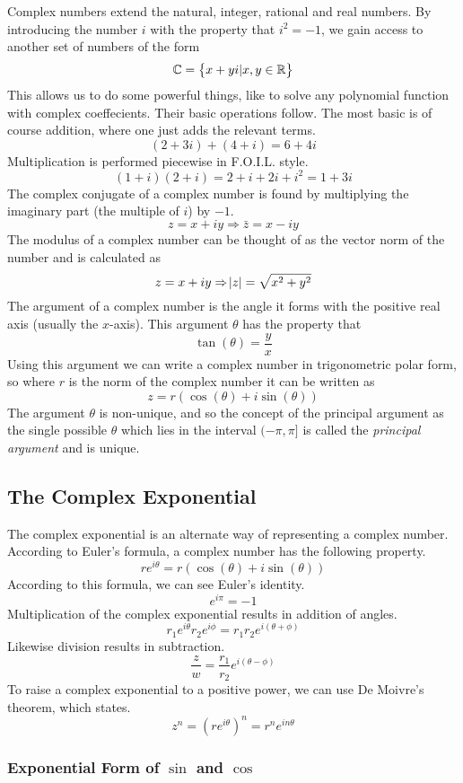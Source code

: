 \documentclass[12pt]{report}
\newcommand{\R}{\mathbb{R}}
\newcommand{\C}{\mathbb{C}}
\begin{document}
\begin{flushleft}
Complex numbers extend the natural, integer, rational and real numbers. By 
introducing the number \(i\) with the property that \(i^2 = -1\), we gain
access to another set of numbers of the form
\[\C = \set{x + yi | x, y \in \R}\]
This allows us to do some powerful things, like to solve any polynomial
function with complex coeffecients. Their basic operations follow. The most
basic is of course addition, where one just adds the relevant terms.
\[(2 + 3i) + (4 + i) = 6 + 4i\]
Multiplication is performed piecewise in F.O.I.L. style.
\[(1 + i)(2 + i) = 2 + i + 2i + i^2 = 1 + 3i\]
The complex conjugate of a complex number is found by multiplying the imaginary
part (the multiple of \(i\)) by \(-1\).
\[z = x + iy \Rightarrow \bar{z} = x - iy\]
The modulus of a complex number can be thought of as the vector norm of the
number and is calculated as
\[z = x + iy \Rightarrow \abs{z} = \sqrt{x^2 + y^2}\]
The argument of a complex number is the angle it forms with the positive real
axis (usually the \(x\)-axis). This argument \(\theta\) has the property that
\[\tan(\theta) = \frac{y}{x}\]
Using this argument we can write a complex number in trigonometric polar form,
so where \(r\) is the norm of the complex number it can be written as
\[z = r(\cos(\theta) + i\sin(\theta))\]
The argument \(\theta\) is non-unique, and so the concept of the principal 
argument as the single possible \(\theta\) which lies in the interval 
\((-\pi, \pi]\) is called the \textit{principal argument} and is unique.

\subsection*{The Complex Exponential}

The complex exponential is an alternate way of representing a complex number.
According to Euler's formula, a complex number has the following property.
\[re^{i\theta} = r(\cos(\theta) + i\sin(\theta))\]
According to this formula, we can see Euler's identity.
\[e^{i\pi} = -1\]
Multiplication of the complex exponential results in addition of angles.
\[r_1e^{i\theta}r_2e^{i\phi} = r_1r_2e^{i(\theta + \phi)}\]
Likewise division results in subtraction.
\[\frac{z}{w} = \frac{r_1}{r_2}e^{i(\theta - \phi)}\]
To raise a complex exponential to a positive power, we can use De Moivre's
theorem, which states.
\[z^n = \left(re^{i\theta}\right)^n = r^ne^{in\theta}\]

\subsubsection*{Exponential Form of \(\sin\) and \(\cos\)}


\end{flushleft}
\end{document}
